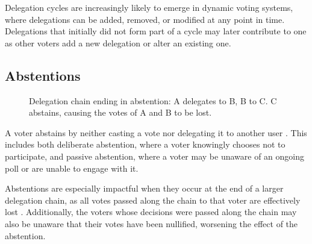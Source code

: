 Delegation cycles are increasingly likely to emerge in dynamic voting systems, where delegations can be added, removed, or modified at any point in time. Delegations that initially did not form part of a cycle may later contribute to one as other voters add a new delegation or alter an existing one.
\subsection*{Abstentions}
\begin{figure}[H]
  \centering
  \caption{Delegation chain ending in abstention: A delegates to B, B to C. C abstains, causing the votes of A and B to be lost.}
  \label{fig:delegation-abstention}
\end{figure}

A voter abstains by neither casting a vote nor delegating it to another user \citep{brill_liquid_2022}. This includes both deliberate abstention, where a voter knowingly chooses not to participate, and passive abstention, where a voter may be unaware of an ongoing poll or are unable to engage with it.

Abstentions are especially impactful when they occur at the end of a larger delegation chain, as all votes passed along the chain to that voter are effectively lost \citep{brill_liquid_2022}. Additionally, the voters whose decisions were passed along the chain may also be unaware that their votes have been nullified, worsening the effect of the abstention.

